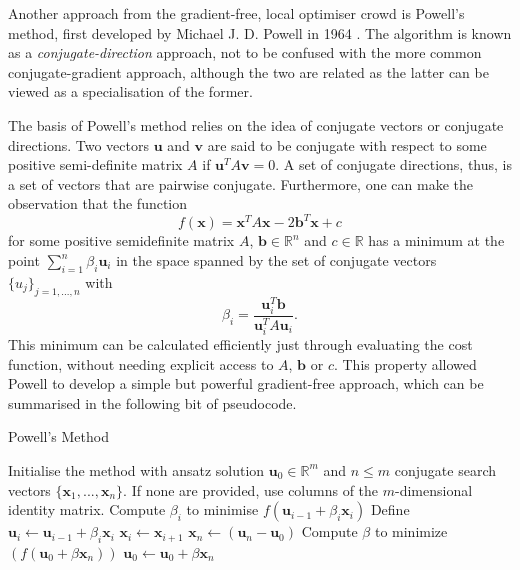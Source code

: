 \documentclass[a4paper,oneside,11pt]{book}
\newcommand{\ubb}{\boldsymbol{u}}
\newcommand{\xbb}{\boldsymbol{x}}
\newcommand{\R}{\mathbb{R}}
\begin{document}
Another approach from the gradient-free, local optimiser crowd is Powell's method, first developed by Michael J. D. Powell in 1964 \cite{powell_efficient_1964}. The algorithm is known as a \emph{conjugate-direction} approach, not to be confused with the more common conjugate-gradient approach, although the two are related as the latter can be viewed as a specialisation of the former. 

The basis of Powell's method relies on the idea of conjugate vectors or conjugate directions. Two vectors $\ubb$ and $\boldsymbol{v}$ are said to be conjugate with respect to some positive semi-definite matrix $A$ if $\ubb^T A \boldsymbol{v} = 0$. A set of conjugate directions, thus, is a set of vectors that are pairwise conjugate. Furthermore, one can make the observation \cite{brent_algorithms_2002} that the function
\begin{equation}
    f(\xbb) = \xbb^T A \xbb - 2\boldsymbol{b}^T \xbb + c
\end{equation}
for some positive semidefinite matrix $A$, $\boldsymbol{b} \in \R^n$ and $c \in \R$ has a minimum at the point $\sum_{i=1}^n \beta_i \ubb_i$ in the space spanned by the set of conjugate vectors $\{ u_j \}_{j = 1,...,n}$ with
\begin{equation}
    \beta_i = \frac{\ubb_i^T\boldsymbol{b}}{\ubb_i^T A \ubb_i}.
\end{equation}
This minimum can be calculated efficiently just through evaluating the cost function, without needing explicit access to $A$, $\boldsymbol{b}$ or $c$. This property allowed Powell to develop a simple but powerful gradient-free approach, which can be summarised in the following bit of pseudocode.
\begin{algorithm}
\caption{Powell's Method}
\begin{algorithmic}[1]
\State Initialise the method with ansatz solution $\ubb_0 \in \R^m$ and $n \leq m$ conjugate search vectors $\{\xbb_1, ..., \xbb_n \}$. If none are provided, use columns of the $m$-dimensional identity matrix.
\State Compute $\beta_i$ to minimise $f(\ubb_{i - 1} + \beta_i \xbb_i)$
\State Define $\ubb_i \gets \ubb_{i - 1} + \beta_i \xbb_i$
\EndFor
{}
\State $\xbb_{i} \gets \xbb_{i+1}$
\EndFor
\State $\xbb_n \gets (\ubb_n - \ubb_0)$
\State Compute $\beta$ to minimize $(f(\ubb_0  + \beta \xbb_n))$
\State $\ubb_0 \gets \ubb_0 + \beta \xbb_n$
\EndProcedure
\end{algorithmic}
\end{algorithm}
\end{document}
